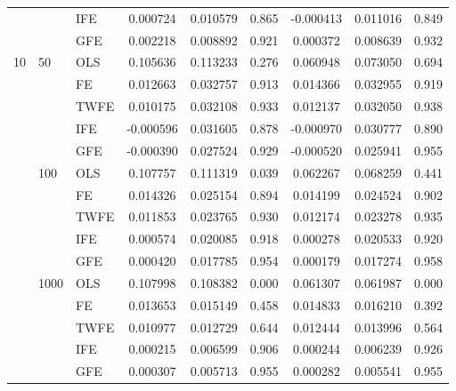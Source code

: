 \begin{tabular}{lll|ccc|ccc}
   &      & IFE   &  0.000724 &  0.010579 &                 0.865 & -0.000413 &  0.011016 &                 0.849 \\
   &      & GFE  &  0.002218 &  0.008892 &                 0.921 &  0.000372 &  0.008639 &                 0.932 \\
10 & 50   & OLS  &  0.105636 &  0.113233 &                 0.276 &  0.060948 &  0.073050 &                 0.694 \\
   &      & FE  &  0.012663 &  0.032757 &                 0.913 &  0.014366 &  0.032955 &                 0.919 \\
   &      & TWFE  &  0.010175 &  0.032108 &                 0.933 &  0.012137 &  0.032050 &                 0.938 \\
   &      & IFE  & -0.000596 &  0.031605 &                 0.878 & -0.000970 &  0.030777 &                 0.890 \\
   &      & GFE  & -0.000390 &  0.027524 &                 0.929 & -0.000520 &  0.025941 &                 0.955 \\
   & 100  & OLS  &  0.107757 &  0.111319 &                 0.039 &  0.062267 &  0.068259 &                 0.441 \\
   &      & FE  &  0.014326 &  0.025154 &                 0.894 &  0.014199 &  0.024524 &                 0.902 \\
   &      & TWFE  &  0.011853 &  0.023765 &                 0.930 &  0.012174 &  0.023278 &                 0.935 \\
   &      & IFE   &  0.000574 &  0.020085 &                 0.918 &  0.000278 &  0.020533 &                 0.920 \\
   &      & GFE  &  0.000420 &  0.017785 &                 0.954 &  0.000179 &  0.017274 &                 0.958 \\
   & 1000 & OLS  &  0.107998 &  0.108382 &                 0.000 &  0.061307 &  0.061987 &                 0.000 \\
   &      & FE  &  0.013653 &  0.015149 &                 0.458 &  0.014833 &  0.016210 &                 0.392 \\
   &      & TWFE  &  0.010977 &  0.012729 &                 0.644 &  0.012444 &  0.013996 &                 0.564 \\
   &      & IFE  &  0.000215 &  0.006599 &                 0.906 &  0.000244 &  0.006239 &                 0.926 \\
   &      & GFE  &  0.000307 &  0.005713 &                 0.955 &  0.000282 &  0.005541 &                 0.955 \\

\end{tabular}
